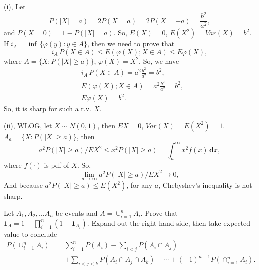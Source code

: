 \documentclass[en, normal, 11pt, black]{elegantnote}
\newenvironment{exercise}[1]{\begin{tcolorbox}[colback=black!15, colframe=black!80, breakable, title=#1]}{\end{tcolorbox}}
\renewenvironment{proof}{\begin{tcolorbox}[colback=white, colframe=black!50, breakable, title=Proof. ]\setlength{\parskip}{0.8em}}{\,\\\rightline{$\square$}\end{tcolorbox}}
\newcommand{\der}{\,\mathbf{d}}
\begin{document}
    \begin{proof}
        (i), Let 
        \[
            P(|X|=a)=2P(X=a)=2P(X=-a)=\frac{b^2}{a^2}, 
        \]
        and $P(X=0)=1-P(|X|=a)$. So, $E(X)=0$, $E(X^2)=Var(X)=b^2$. If $i_{A}=\inf\,\{\varphi(y): y \in A\}$, then we need to prove that
        \[
            i_{A}\,P(X \in A) \leq E(\varphi(X) ; X \in A) \leq E \varphi(X), 
        \]
        where $A=\{X:P(|X|\geqslant a)\}$, $\varphi(X)=X^2$. So, we have
        \begin{align*}
            &i_{A}\,P(X \in A)=a^2\frac{b^2}{a^2}=b^2, \\
            &E(\varphi(X) ; X \in A)=a^2\frac{b^2}{a^2}=b^2, \\
            &E \varphi(X)=b^2. 
        \end{align*}
        So, it is sharp for such a r.v. $X$. 
        
        (ii), WLOG, let $X\sim N(0,1)$, then $EX=0$, $Var(X)=E(X^2)=1$. $A_a=\{X:P(|X|\geqslant a)\}$, then
        \[
            a^{2} P(|X| \geq a) / E X^{2}\leqslant x^2 P(|X| \geq a)=\int_{a}^\infty x^2 f(x)\der x, 
        \]
        where $f(\cdot)$ is pdf of $X$. So, 
        \[
            \lim_{a\to\infty}a^{2} P(|X| \geq a) / E X^{2}\longrightarrow 0, 
        \]
        And because $a^{2} P(|X| \geq a)\leqslant E(X^2)$, for any $a$, Chebyshev’s inequality is not sharp. 
    \end{proof}


    \begin{exercise}{1.6.9. Inclusion-exclusion formula.}
        Let $A_{1}, A_{2}, \ldots A_{n}$ be events and $A=\cup_{i=1}^{n} A_{i}$. Prove that $\mathbf{1}_{A}=1-\prod_{i=1}^{n}\left(1-\mathbf{1}_{A_{i}}\right)$. Expand out the right-hand side, then take expected value to conclude
        \begin{align*}
            P\left(\cup_{i=1}^{n} A_{i}\right)=& \sum_{i=1}^{n} P\left(A_{i}\right)-\sum_{i<j} P\left(A_{i} \cap A_{j}\right) \\
            &+\sum_{i<j<k} P\left(A_{i} \cap A_{j} \cap A_{k}\right)-\cdots+(-1)^{n-1} P\left(\cap_{i=1}^{n} A_{i}\right). 
        \end{align*}
    \end{exercise}
\end{document}
